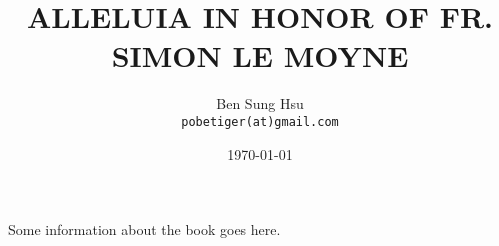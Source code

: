 \documentclass[11pt]{book} %
\begin{document}

\def\greinitialformat#1{%
  {\fontsize{43}{43}\selectfont #1}%
}

\redlines


\frontmatter

\title{ALLELUIA IN HONOR OF FR. SIMON LE MOYNE}
\author{Ben Sung Hsu\\
  \texttt{pobetiger(at)gmail.com}}
\date{\today}
\maketitle


\begin{paragraph}\noindent
Some information about the book goes here.
\end{paragraph}


\end{document}
